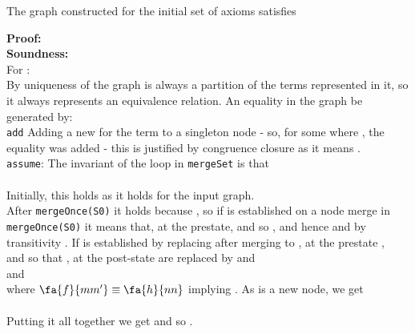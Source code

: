 \begin{theorem}
The graph  constructed for the initial set of axioms  satisfies 

\noindent
\textbf{Proof:} \\
\textbf{Soundness:}\\
For  :\\
By uniqueness of \GFAECs{} the graph is always a partition of the terms represented in it, so it always represents an equivalence relation. 
An equality  in the graph be generated by:\\
\lstinline{add} Adding a new \GFAEC {} for the term  to a singleton node  - so, for some  where , the equality  was added - this is justified by congruence closure as it means .\\
\bigskip
\lstinline{assume}: The invariant of the loop in \lstinline{mergeSet} is that \\
\\
Initially, this holds as it holds for the input graph.\\
After \lstinline{mergeOnce(S0)} it holds because , 
so if  is established on a node merge in \lstinline{mergeOnce(S0)} it means that, at the prestate,  and so , and hence  and by transitivity .
If  is established by replacing \GFAECs{} after merging  to , 
at the prestate , \\
and  so that , at the post-state 
 are replaced by 
 and \\
 and \\
where $\fa{f}{mm'} \equiv \fa{h}{nn}$ implying .
As  is a new node, we get \\
 \\
Putting it all together we get  and so .


\end{theorem}
